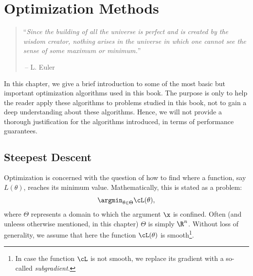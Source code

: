 \documentclass[../../book-main.tex]{subfiles}
\begin{document}
\chapter{Optimization Methods}
\label{app:optimization}

\begin{quote}
``{\em Since the building of all the universe is perfect and is created by the wisdom creator, nothing arises in the universe in which one cannot see the sense of some maximum or minimum.}''

$~$\hfill -- L. Euler
 \end{quote}
\vspace{5mm}

In this chapter, we give a brief introduction to some of the most basic but important optimization algorithms used in this book. The purpose is only to help the reader apply these algorithms to problems studied in this book, not to gain a deep understanding about these algorithms. Hence, we will not provide a thorough justification for the algorithms introduced, in terms of  performance guarantees. 

\section{Steepest Descent}


Optimization is concerned with the question of how to find where a function, say $L(\theta)$, reaches its minimum value. Mathematically, this is stated as a problem:
\begin{equation}
    \argmin_{\theta \in \Theta} \cL(\theta),
\end{equation}
where $\Theta$ represents a domain to which the argument $\x$ is confined. Often (and unleess otherwise mentioned, in this chapter) $\Theta$ is simply $\R^n$. Without loss of generality, we assume that here the function $\cL(\theta)$ is smooth\footnote{In case the function \(\cL\) is not smooth, we replace its gradient with a so-called \textit{subgradient}.}. 
\end{document}
